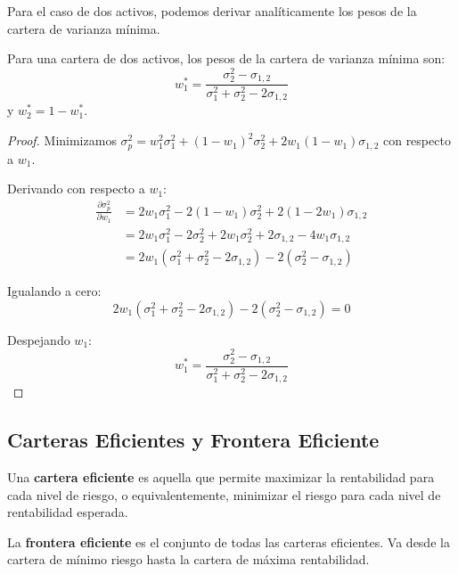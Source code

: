 Para el caso de dos activos, podemos derivar analíticamente los pesos de la cartera de varianza mínima.

\begin{teorema}
Para una cartera de dos activos, los pesos de la cartera de varianza mínima son:
\begin{equation}
w_1^* = \frac{\sigma_2^2 - \sigma_{1,2}}{\sigma_1^2 + \sigma_2^2 - 2\sigma_{1,2}}
\end{equation}
y $w_2^* = 1 - w_1^*$.
\end{teorema}

\begin{proof}
Minimizamos $\sigma_p^2 = w_1^2 \sigma_1^2 + (1-w_1)^2 \sigma_2^2 + 2w_1(1-w_1)\sigma_{1,2}$ con respecto a $w_1$.

Derivando con respecto a $w_1$:
\begin{align*}
\frac{\partial \sigma_p^2}{\partial w_1} &= 2w_1 \sigma_1^2 - 2(1-w_1)\sigma_2^2 + 2(1-2w_1)\sigma_{1,2} \\
&= 2w_1 \sigma_1^2 - 2\sigma_2^2 + 2w_1 \sigma_2^2 + 2\sigma_{1,2} - 4w_1 \sigma_{1,2} \\
&= 2w_1(\sigma_1^2 + \sigma_2^2 - 2\sigma_{1,2}) - 2(\sigma_2^2 - \sigma_{1,2})
\end{align*}

Igualando a cero:
$$2w_1(\sigma_1^2 + \sigma_2^2 - 2\sigma_{1,2}) - 2(\sigma_2^2 - \sigma_{1,2}) = 0$$

Despejando $w_1$:
$$w_1^* = \frac{\sigma_2^2 - \sigma_{1,2}}{\sigma_1^2 + \sigma_2^2 - 2\sigma_{1,2}}$$
\end{proof}

\subsection{Carteras Eficientes y Frontera Eficiente}

\begin{definicion}
Una \textbf{cartera eficiente} es aquella que permite maximizar la rentabilidad para cada nivel de riesgo, o equivalentemente, minimizar el riesgo para cada nivel de rentabilidad esperada.
\end{definicion}

\begin{definicion}
La \textbf{frontera eficiente} es el conjunto de todas las carteras eficientes. Va desde la cartera de mínimo riesgo hasta la cartera de máxima rentabilidad.
\end{definicion}

